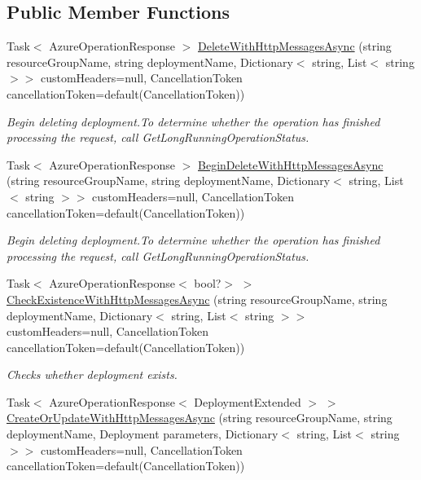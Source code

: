 \subsection*{Public Member Functions}
\begin{DoxyCompactItemize}
\item 
Task$<$ Azure\+Operation\+Response $>$ \hyperlink{interface_microsoft_1_1_azure_1_1_management_1_1_resources_1_1_i_deployments_operations_a2f60c8afe521264fde75d8d932297df9}{Delete\+With\+Http\+Messages\+Async} (string resource\+Group\+Name, string deployment\+Name, Dictionary$<$ string, List$<$ string $>$$>$ custom\+Headers=null, Cancellation\+Token cancellation\+Token=default(Cancellation\+Token))
\begin{DoxyCompactList}\small\item\em Begin deleting deployment.\+To determine whether the operation has finished processing the request, call Get\+Long\+Running\+Operation\+Status. \end{DoxyCompactList}\item 
Task$<$ Azure\+Operation\+Response $>$ \hyperlink{interface_microsoft_1_1_azure_1_1_management_1_1_resources_1_1_i_deployments_operations_ac40e576289a92a4ca19094778ff73ca4}{Begin\+Delete\+With\+Http\+Messages\+Async} (string resource\+Group\+Name, string deployment\+Name, Dictionary$<$ string, List$<$ string $>$$>$ custom\+Headers=null, Cancellation\+Token cancellation\+Token=default(Cancellation\+Token))
\begin{DoxyCompactList}\small\item\em Begin deleting deployment.\+To determine whether the operation has finished processing the request, call Get\+Long\+Running\+Operation\+Status. \end{DoxyCompactList}\item 
Task$<$ Azure\+Operation\+Response$<$ bool?$>$ $>$ \hyperlink{interface_microsoft_1_1_azure_1_1_management_1_1_resources_1_1_i_deployments_operations_a809179e8e439d8c237c81fb67c9fb502}{Check\+Existence\+With\+Http\+Messages\+Async} (string resource\+Group\+Name, string deployment\+Name, Dictionary$<$ string, List$<$ string $>$$>$ custom\+Headers=null, Cancellation\+Token cancellation\+Token=default(Cancellation\+Token))
\begin{DoxyCompactList}\small\item\em Checks whether deployment exists. \end{DoxyCompactList}\item 
Task$<$ Azure\+Operation\+Response$<$ Deployment\+Extended $>$ $>$ \hyperlink{interface_microsoft_1_1_azure_1_1_management_1_1_resources_1_1_i_deployments_operations_a37f3c71c9c2e4089aa73bcf3ef4a44d7}{Create\+Or\+Update\+With\+Http\+Messages\+Async} (string resource\+Group\+Name, string deployment\+Name, Deployment parameters, Dictionary$<$ string, List$<$ string $>$$>$ custom\+Headers=null, Cancellation\+Token cancellation\+Token=default(Cancellation\+Token))

\end{DoxyCompactItemize}
